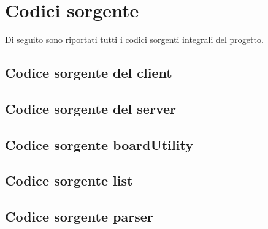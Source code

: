 \documentclass[a4paper]{article}
\begin{document}
\pagebreak

\appendix
\section{Codici sorgente}
Di seguito sono riportati tutti i codici sorgenti integrali del progetto.
\subsection{Codice sorgente del client}

\subsection{Codice sorgente del server}

\subsection{Codice sorgente boardUtility}


\subsection{Codice sorgente list}


\subsection{Codice sorgente parser}


\pagebreak
\lstlistoflistings
\end{document}
